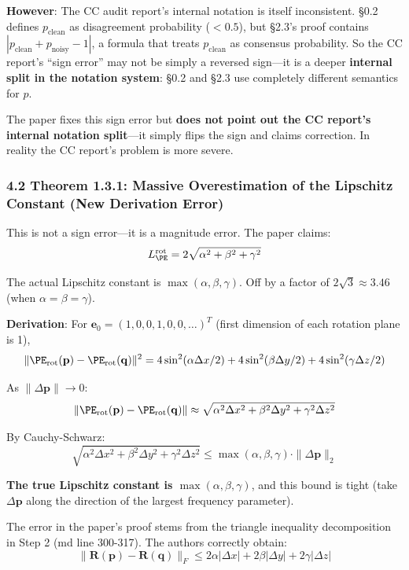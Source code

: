\documentclass[
  12pt,
]{article}
\begin{document}
\textbf{However}: The CC audit report's internal notation is itself inconsistent. \S0.2 defines \(p_{\text{clean}}\) as disagreement probability (\(<0.5\)), but \S2.3's proof contains \(|p_{\text{clean}} + p_{\text{noisy}} - 1|\), a formula that treats \(p_{\text{clean}}\) as consensus probability. So the CC report's ``sign error'' may not be simply a reversed sign---it is a deeper \textbf{internal split in the notation system}: \S0.2 and \S2.3 use completely different semantics for \(p\).

The paper fixes this sign error but \textbf{does not point out the CC report's internal notation split}---it simply flips the sign and claims correction. In reality the CC report's problem is more severe.

\subsubsection{4.2 Theorem 1.3.1: Massive Overestimation of the Lipschitz Constant (New Derivation Error)}\label{theorem-131-lipschitz-overestimation}

This is not a sign error---it is a magnitude error. The paper claims:
\[L_{\PE}^{\text{rot}} = 2\sqrt{\alpha^2 + \beta^2 + \gamma^2}\]

The actual Lipschitz constant is \(\max(\alpha, \beta, \gamma)\). Off by a factor of \(2\sqrt{3} \approx 3.46\) (when \(\alpha=\beta=\gamma\)).

\textbf{Derivation}: For \(\mathbf{e}_0 = (1,0,0,1,0,0,\ldots)^T\) (first dimension of each rotation plane is 1),
\[\|\PE_{\text{rot}}(\mathbf{p}) - \PE_{\text{rot}}(\mathbf{q})\|^2 = 4\sin^2(\alpha\Delta x/2) + 4\sin^2(\beta\Delta y/2) + 4\sin^2(\gamma\Delta z/2)\]

As \(\|\Delta\mathbf{p}\| \to 0\):
\[\|\PE_{\text{rot}}(\mathbf{p}) - \PE_{\text{rot}}(\mathbf{q})\| \approx \sqrt{\alpha^2\Delta x^2 + \beta^2\Delta y^2 + \gamma^2\Delta z^2}\]

By Cauchy-Schwarz:
\[\sqrt{\alpha^2\Delta x^2 + \beta^2\Delta y^2 + \gamma^2\Delta z^2} \leq \max(\alpha, \beta, \gamma) \cdot \|\Delta\mathbf{p}\|_2\]

\textbf{The true Lipschitz constant is \(\max(\alpha, \beta, \gamma)\)}, and this bound is tight (take \(\Delta\mathbf{p}\) along the direction of the largest frequency parameter).

The error in the paper's proof stems from the triangle inequality decomposition in Step 2 (md line 300-317). The authors correctly obtain:
\[\|\mathbf{R}(\mathbf{p}) - \mathbf{R}(\mathbf{q})\|_F \leq 2\alpha|\Delta x| + 2\beta|\Delta y| + 2\gamma|\Delta z|\]
\end{document}
